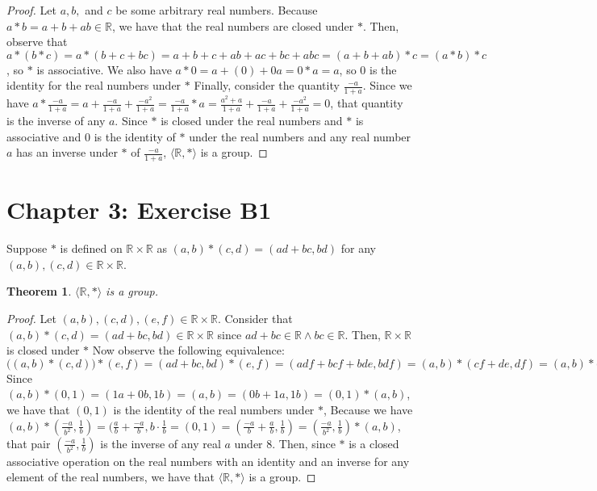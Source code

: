 \documentclass[12pt]{article}
\newcommand{\reals}{\mathbb{R}}
\newtheorem{thm}{Theorem}
\begin{document}
\begin{proof}
	Let $a,b,$ and $c$ be some arbitrary real numbers.
	Because $a * b = a + b + ab \in \reals$, we have that the real numbers are closed under $*$.
	Then, observe that $a * (b * c)  = a * (b + c + bc) = a + b + c + ab + ac + bc + abc = (a + b + ab) * c = (a * b) * c$, so $*$ is associative.
	We also have $a * 0 = a + (0) + 0a = 0 * a = a$, so $0$ is the identity for the real numbers under $*$
	Finally, consider the quantity $\frac{-a}{1+a}$.
	Since we have $a * \frac{-a}{1+a} = a + \frac{-a}{1+a} +  \frac{-a^2}{1+a} = \frac{-a}{1 + a} * a = \frac{a^2+a}{1+a} + \frac{-a}{1+a} + \frac{-a^2}{1+a} = 0$, that quantity is the inverse of any $a$.
	Since $*$ is closed under the real numbers and $*$ is associative and $0$ is the identity of $*$ under the real numbers and any real number $a$ has an inverse under $*$ of $\frac{-a}{1+a}$, $\langle \reals, * \rangle$ is a group.
\end{proof}

\section{Chapter 3: Exercise B1}

Suppose $*$ is defined on $\reals \times \reals$ as $(a,b) * (c,d) = (ad+bc,bd)$ for any $(a,b),(c,d) \in \reals \times \reals$.

\begin{thm}
	$\langle \reals, * \rangle$ is a group.
\end{thm}

\begin{proof}
	Let $(a,b),(c,d),(e,f) \in \reals \times \reals$.
	Consider that $(a,b) * (c,d) = (ad+bc,bd) \in \reals \times \reals$ since $ad+bc \in \reals \land bc \in \reals$. Then, $\reals \times \reals$ is closed under $*$
	Now observe the following equivalence: $\Big((a,b) * (c,d)\Big) * (e,f) = (ad+bc,bd) * (e,f) = (adf+bcf+bde,bdf) = (a,b) * (cf+de,df) = (a,b) * \Big((c,d) * (e,f)\Big)$
	Since $(a,b) * (0,1) = (1a+0b,1b) = (a,b) = (0b + 1a,1b) = (0,1) * (a,b)$, we have that $(0,1)$ is the identity of the real numbers under $*$,
	Because we have $(a,b)*(\frac{-a}{b^2},\frac{1}{b})=(\frac{a}{b}+\frac{-a}{b}, b \cdot \frac{1}{b} = (0,1) = (\frac{-a}{b}+\frac{a}{b},\frac{1}{b}) = (\frac{-a}{b^2},\frac{1}{b}) * (a,b)$, that pair $(\frac{-a}{b^2},\frac{1}{b})$ is the inverse of any real $a$ under $8$.
	Then, since $*$ is a closed associative operation on the real numbers with an identity and an inverse for any element of the real numbers, we have that $\langle \reals, * \rangle$ is a group.
	
\end{proof}
\end{document}
